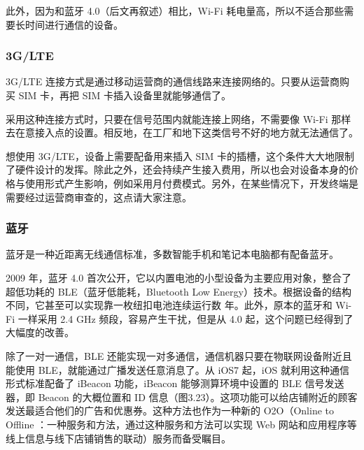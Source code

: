 \documentclass[12pt,UTF8]{ctexbook}
\begin{document}
此外，因为和蓝牙 4.0（后文再叙述）相比，Wi-Fi 耗电量高，所以不适合那些需要长时间进行通信的设备。

\subsubsection{3G/LTE}

3G/LTE 连接方式是通过移动运营商的通信线路来连接网络的。只要从运营商购买 SIM 卡，再把 SIM 卡插入设备里就能够通信了。

采用这种连接方式时，只要在信号范围内就能连接上网络，不需要像 Wi-Fi 那样去在意接入点的设置。相反地，在工厂和地下这类信号不好的地方就无法通信了。

想使用 3G/LTE，设备上需要配备用来插入 SIM 卡的插槽，这个条件大大地限制了硬件设计的发挥。除此之外，还会持续产生接入费用，所以也会对设备本身的价格与使用形式产生影响，例如采用月付费模式。另外，在某些情况下，开发终端是需要经过运营商审查的，这点请大家注意。

\subsubsection{蓝牙}

蓝牙是一种近距离无线通信标准，多数智能手机和笔记本电脑都有配备蓝牙。

2009 年，蓝牙 4.0 首次公开，它以内置电池的小型设备为主要应用对象，整合了超低功耗的 BLE（蓝牙低能耗，Bluetooth Low Energy）技术。根据设备的结构不同，它甚至可以实现靠一枚纽扣电池连续运行数
年。此外，原本的蓝牙和 Wi-Fi 一样采用 2.4 GHz 频段，容易产生干扰，但是从 4.0 起，这个问题已经得到了大幅度的改善。

除了一对一通信，BLE 还能实现一对多通信，通信机器只要在物联网设备附近且能使用 BLE，就能通过广播发送任意消息了。从 iOS7 起，iOS 就利用这种通信形式标准配备了 iBeacon 功能，iBeacon 能够测算环境中设置的 BLE 信号发送器，即 Beacon 的大概位置和 ID 信息（图3.23）。这项功能可以给店铺附近的顾客发送最适合他们的广告和优惠券。这种方法也作为一种新的 O2O（Online to Offline ：一种服务和方法，通过这种服务和方法可以实现 Web 网站和应用程序等线上信息与线下店铺销售的联动）服务而备受瞩目。
\end{document}
